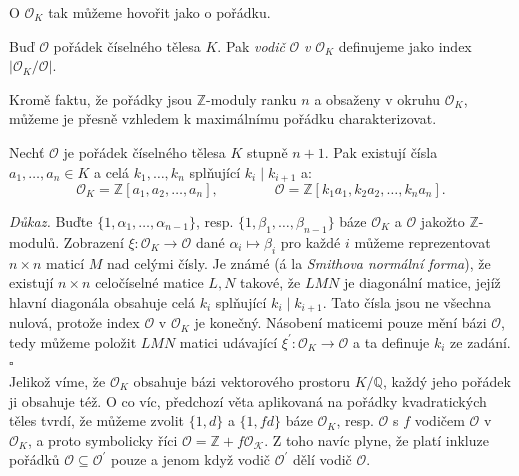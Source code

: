 \documentclass[12pt]{report}
\begin{document}
O $\mathcal{O}_K$ tak můžeme hovořit jako o  pořádku.

\begin{definice}
Buď $\mathcal{O}$ pořádek číselného tělesa $K$. Pak \textit{vodič} $\mathcal{O}$ \textit{v} $\mathcal{O}_K$ definujeme jako index $\vert \mathcal{O}_K / \mathcal{O}\vert$.
\end{definice}

Kromě faktu, že pořádky jsou $\mathbb{Z}$-moduly ranku $n$ a obsaženy v okruhu $\mathcal{O}_K$, můžeme je přesně vzhledem k maximálnímu pořádku charakterizovat.

\begin{veta}
Nechť $\mathcal{O}$ je pořádek číselného tělesa $K$ stupně $n+1$. Pak existují čísla $a_1,\dots,a_n \in K$ a celá $k_1,\dots,k_n$ splňující $k_i \mid k_{i+1}$ a:
\begin{equation*}
\mathcal{O}_K = \mathbb{Z}[a_1,a_2,\dots,a_n], \qquad \qquad \mathcal{O} = \mathbb{Z}[k_1 a_1, k_2 a_2, \dots, k_n a_n].
\end{equation*}
\end{veta}
\noindent \textit{Důkaz.} Buďte $\lbrace 1,\alpha_1,\dots,\alpha_{n-1} \rbrace$, resp. $\lbrace 1,\beta_1,\dots,\beta_{n-1} \rbrace$ báze $\mathcal{O}_K$ a $\mathcal{O}$ jakožto $\mathbb{Z}$-modulů. Zobrazení $\xi:\mathcal{O}_K \longrightarrow \mathcal{O}$ dané $\alpha_i \longmapsto \beta_i$ pro každé $i$ můžeme reprezentovat $n \times n$ maticí $M$ nad celými čísly. Je známé (á la \textit{Smithova normální forma}), že existují $n \times n$ celočíselné matice $L,N$ takové, že $LMN$ je diagonální matice, jejíž hlavní diagonála obsahuje celá $k_i$ splňující $k_i \mid k_{i+1}$. Tato čísla jsou ne všechna nulová, protože index $\mathcal{O}$ v $\mathcal{O}_K$ je konečný. Násobení maticemi pouze mění bázi $\mathcal{O}$, tedy můžeme položit $LMN$ matici udávající $\xi^\prime : \mathcal{O}_K \longrightarrow \mathcal{O}$ a ta definuje $k_i$ ze zadání. \hfill $\square$\\

Jelikož víme, že $\mathcal{O}_K$ obsahuje bázi vektorového prostoru $K/\mathbb{Q}$, každý jeho pořádek ji obsahuje též. O co víc, předchozí věta aplikovaná na pořádky kvadratických těles tvrdí, že můžeme zvolit $\lbrace 1,d \rbrace$ a $\lbrace 1,fd \rbrace$ báze $\mathcal{O}_K$, resp. $\mathcal{O}$ s $f$ vodičem $\mathcal{O}$ v $\mathcal{O}_K$, a proto symbolicky říci $\mathcal{O} = \mathbb{Z}+ f\mathcal{O_K}$. Z toho navíc plyne, že platí inkluze pořádků $\mathcal{O} \subseteq \mathcal{O}^\prime$ pouze a jenom když vodič $\mathcal{O}^\prime$ dělí vodič $\mathcal{O}$.
\end{document}
